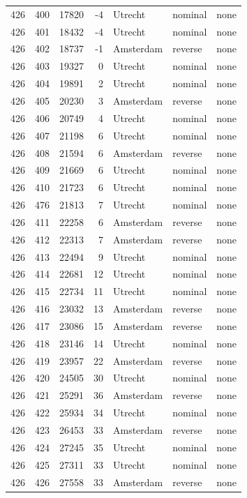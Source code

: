 \documentclass{template/openetcs_article}
\begin{document}
\begin{longtable}{|r |r |r |r |l |l |l |}
426 & 400 & 17820 & -4 & Utrecht & nominal & none \\
426 & 401 & 18432 & -4 & Utrecht & nominal & none \\
426 & 402 & 18737 & -1 & Amsterdam & reverse & none \\
426 & 403 & 19327 & 0 & Utrecht & nominal & none \\
426 & 404 & 19891 & 2 & Utrecht & nominal & none \\
426 & 405 & 20230 & 3 & Amsterdam & reverse & none \\
426 & 406 & 20749 & 4 & Utrecht & nominal & none \\
426 & 407 & 21198 & 6 & Utrecht & nominal & none \\
426 & 408 & 21594 & 6 & Amsterdam & reverse & none \\
426 & 409 & 21669 & 6 & Utrecht & nominal & none \\
426 & 410 & 21723 & 6 & Utrecht & nominal & none \\
426 & 476 & 21813 & 7 & Utrecht & nominal & none \\
426 & 411 & 22258 & 6 & Amsterdam & reverse & none \\
426 & 412 & 22313 & 7 & Amsterdam & reverse & none \\
426 & 413 & 22494 & 9 & Utrecht & nominal & none \\
426 & 414 & 22681 & 12 & Utrecht & nominal & none \\
426 & 415 & 22734 & 11 & Utrecht & nominal & none \\
426 & 416 & 23032 & 13 & Amsterdam & reverse & none \\
426 & 417 & 23086 & 15 & Amsterdam & reverse & none \\
426 & 418 & 23146 & 14 & Utrecht & nominal & none \\
426 & 419 & 23957 & 22 & Amsterdam & reverse & none \\
426 & 420 & 24505 & 30 & Utrecht & nominal & none \\
426 & 421 & 25291 & 36 & Amsterdam & reverse & none \\
426 & 422 & 25934 & 34 & Utrecht & nominal & none \\
426 & 423 & 26453 & 33 & Amsterdam & reverse & none \\
426 & 424 & 27245 & 35 & Utrecht & nominal & none \\
426 & 425 & 27311 & 33 & Utrecht & nominal & none \\
426 & 426 & 27558 & 33 & Amsterdam & reverse & none \\

\end{longtable}
\end{document}
